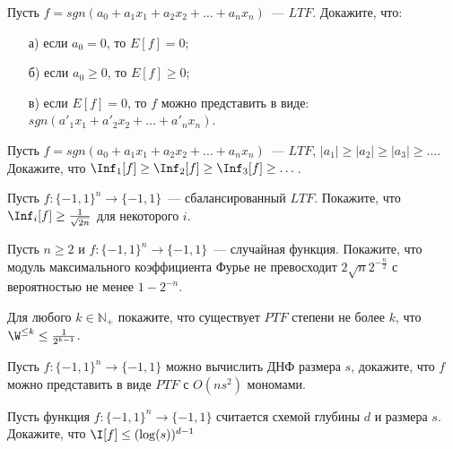 
\begin{task}
    Пусть $f = sgn(a_0 + a_1 x_1 + a_2 x_2 + \dots + a_n x_n)$~--- $LTF$.
    Докажите, что:
    \begin{enumerate}[topsep = 0pt, itemsep = -1ex]
        \item [а)] если $a_0 = 0$, то $E[f] = 0$;
        \item [б)] если $a_0 \ge 0$, то $E[f] \ge 0$;
        \item [в)] если $E[f] = 0$, то $f$ можно представить в виде: $sgn(a'_1 x_1 + a'_2 x_2 + \dots + a'_n x_n)$.
	\end{enumerate}
\end{task}

\begin{task}
	Пусть $f = sgn(a_0 + a_1 x_1 + a_2 x_2 + \dots + a_n x_n)$~--- $LTF$, $|a_1| \ge |a_2| \ge |a_3| \ge \dots$. Докажите,
    что $\Inf_1[f] \ge \Inf_2[f] \ge \Inf_3[f] \ge \dots$.
\end{task}

\begin{task}
    Пусть $f: \{-1, 1\}^n \to \{-1, 1\}$~--- сбалансированный $LTF$. Покажите, что $\Inf_i[f] \ge \frac{1}{\sqrt{2 n}}$ для
    некоторого $i$.
\end{task}

\begin{task}
    Пусть $n \ge 2$ и $f: \{-1, 1\}^n \to \{-1, 1\}$~--- случайная функция. Покажите, что модуль максимального коэффициента
    Фурье не превосходит $2 \sqrt{n} 2^{-\frac{n}{2}}$ с вероятностью не менее $1 - 2^{-n}$.
\end{task}

\begin{task}
    Для любого $k \in \mathbb{N}_{+}$ покажите, что существует $PTF$ степени не более $k$, что $\W^{\le k} \le
    \frac{1}{2^{k - 1}}$.
\end{task}

\begin{task}
    Пусть $f: \{-1, 1\}^n \to \{-1, 1\}$ можно вычислить ДНФ размера $s$, докажите, что $f$ можно представить в виде $PTF$ с
    $O(n s^2)$ мономами.
\end{task}



\breakline

\begin{ptask}{25}
    Пусть функция $f: \{-1, 1\}^n \to \{-1, 1\}$ считается схемой глубины $d$ и размера $s$. Докажите, что $\I[f] \le
    (\log(s))^{d - 1}$
\end{ptask}



